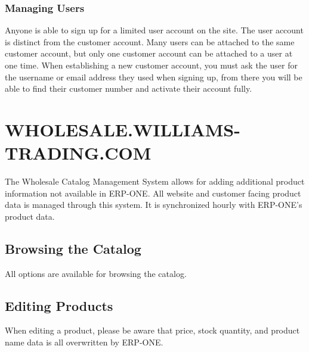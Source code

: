\subsubsection{Managing Users}

Anyone is able to sign up for a limited user account on the site.  The user account is distinct from the customer account.  Many users can be attached to the same customer account, but only one customer account can be attached to a user at one time.  When establishing a new customer account, you must ask the user for the username or email address they used when signing up, from there you will be able to find their customer number and activate their account fully.

\section{WHOLESALE.WILLIAMS-TRADING.COM}

The Wholesale Catalog Management System allows for adding additional product information not available in ERP-ONE.  All website and customer facing product data is managed through this system.  It is synchronized hourly with ERP-ONE's product data.

\subsection{Browsing the Catalog}

All options are available for browsing the catalog.

\subsection{Editing Products}

When editing a product, please be aware that price, stock quantity, and product name data is all overwritten by ERP-ONE.